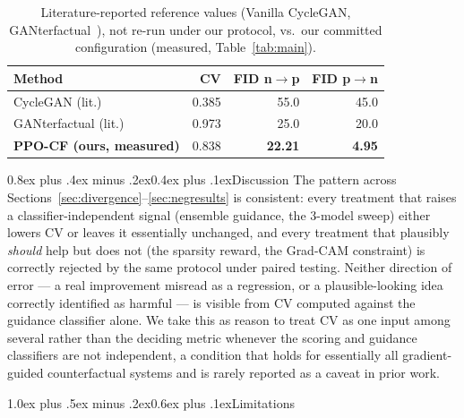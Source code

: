 \documentclass[10pt,twocolumn]{article}
\makeatletter
\renewcommand\section{\@startsection{section}{1}{\z@}%
  {1.0ex plus .5ex minus .2ex}{0.6ex plus .1ex}{\normalfont\large\bfseries}}
\renewcommand\subsection{\@startsection{subsection}{2}{\z@}%
  {0.8ex plus .4ex minus .2ex}{0.4ex plus .1ex}{\normalfont\normalsize\bfseries}}
\newcommand{\method}{\textsc{PPO-CF}}
\makeatother
\begin{document}
\begin{table}[t]
\centering
\small
\caption{Literature-reported reference values (Vanilla CycleGAN,
GANterfactual~\cite{singla2022}), not re-run under our protocol, vs.\ our
committed configuration (measured, Table~\ref{tab:main}).}
\label{tab:baseline}
\begin{tabular}{@{}lrrr@{}}
\toprule
\textbf{Method} & \textbf{CV} & \textbf{FID n$\to$p} & \textbf{FID p$\to$n} \\
\midrule
CycleGAN (lit.) & 0.385 & 55.0 & 45.0 \\
GANterfactual (lit.) & 0.973 & 25.0 & 20.0 \\
\textbf{\method{} (ours, measured)} & 0.838 & \textbf{22.21} & \textbf{4.95} \\
\bottomrule
\end{tabular}
\end{table}

\subsection{Discussion}
The pattern across Sections~\ref{sec:divergence}--\ref{sec:negresults} is
consistent: every treatment that raises a classifier-independent signal
(ensemble guidance, the 3-model sweep) either lowers CV or leaves it
essentially unchanged, and every treatment that plausibly \emph{should}
help but does not (the sparsity reward, the Grad-CAM constraint) is
correctly rejected by the same protocol under paired testing. Neither
direction of error — a real improvement misread as a regression, or a
plausible-looking idea correctly identified as harmful — is visible from
CV computed against the guidance classifier alone. We take this as reason
to treat CV as one input among several rather than the deciding metric
whenever the scoring and guidance classifiers are not independent, a
condition that holds for essentially all gradient-guided counterfactual
systems and is rarely reported as a caveat in prior work.

\section{Limitations}
\label{sec:limitations}
\end{document}
